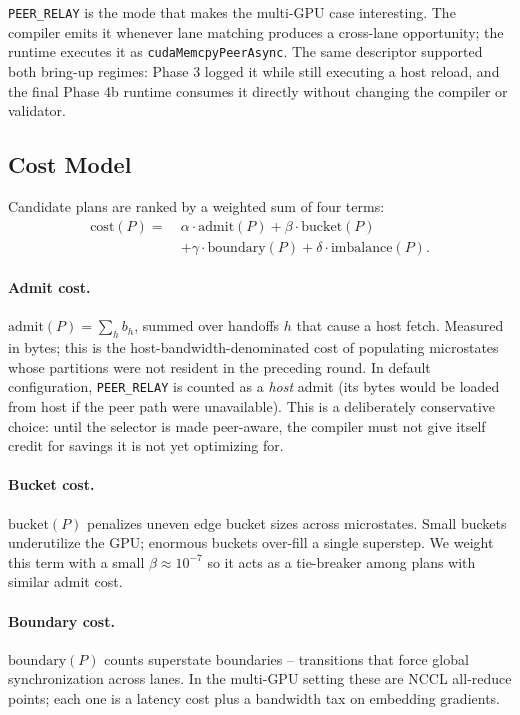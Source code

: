 \texttt{PEER\_RELAY} is the mode that makes the multi-GPU case
interesting. The compiler emits it whenever lane matching produces a
cross-lane opportunity; the runtime executes it as
\texttt{cudaMemcpyPeerAsync}. The same descriptor supported both
bring-up regimes: Phase 3 logged it while still executing a host
reload, and the final Phase 4b runtime consumes it directly without
changing the compiler or validator.

\subsection{Cost Model}\label{sec:ir:cost}

Candidate plans are ranked by a weighted sum of four terms:
\begin{align}
\mathrm{cost}(P) =\ & \alpha \cdot \mathrm{admit}(P)
                    + \beta  \cdot \mathrm{bucket}(P) \nonumber \\
                  & + \gamma \cdot \mathrm{boundary}(P)
                    + \delta \cdot \mathrm{imbalance}(P).
\label{eq:cost}
\end{align}

\paragraph{Admit cost.} $\mathrm{admit}(P) = \sum_h b_h$, summed over
handoffs $h$ that cause a host fetch. Measured in bytes; this is the
host-bandwidth-denominated cost of populating microstates whose
partitions were not resident in the preceding round. In default
configuration, \texttt{PEER\_RELAY} is counted as a \emph{host} admit
(its bytes would be loaded from host if the peer path were
unavailable). This is a deliberately conservative choice: until the
selector is made peer-aware, the compiler must not give itself credit
for savings it is not yet optimizing for.

\paragraph{Bucket cost.} $\mathrm{bucket}(P)$ penalizes uneven edge
bucket sizes across microstates. Small buckets underutilize the GPU;
enormous buckets over-fill a single superstep. We weight this term
with a small $\beta \!\approx\! 10^{-7}$ so it acts as a tie-breaker
among plans with similar admit cost.

\paragraph{Boundary cost.} $\mathrm{boundary}(P)$ counts superstate
boundaries -- transitions that force global synchronization across
lanes. In the multi-GPU setting these are NCCL all-reduce points;
each one is a latency cost plus a bandwidth tax on embedding
gradients.

